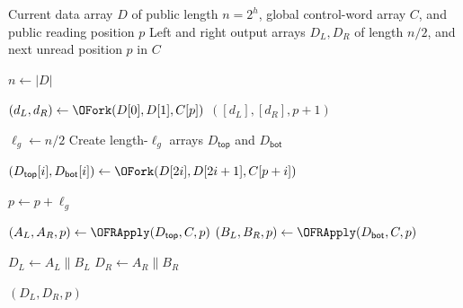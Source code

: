 \begin{algorithm}[t]
\caption{$\OFRApply(D,C,p)$}
\label{alg:ofr-apply}
\begin{algorithmic}[1]
\Require Current data array $D$ of public length $n=2^h$,
global control-word array $C$, and public reading position $p$
\Ensure Left and right output arrays $D_L,D_R$ of length $n/2$,
and next unread position $p$ in $C$

\State $n\gets |D|$

    \State $(d_L,d_R)\gets
           \OFork(D[0],D[1],C[p])$
    \State \Return $([d_L],[d_R],p+1)$
\EndIf

\State $\ell_g\gets n/2$
\State Create length-$\ell_g$ arrays
       $D_{\mathsf{top}}$ and $D_{\mathsf{bot}}$

    \State $(D_{\mathsf{top}}[i],D_{\mathsf{bot}}[i])
           \gets
           \OFork(D[2i],D[2i+1],C[p+i])$
\EndFor

\State $p\gets p+\ell_g$

\State $(A_L,A_R,p)\gets
       \OFRApply(D_{\mathsf{top}},C,p)$
\State $(B_L,B_R,p)\gets
       \OFRApply(D_{\mathsf{bot}},C,p)$

\State $D_L\gets A_L\parallel B_L$
\State $D_R\gets A_R\parallel B_R$

\State \Return $(D_L,D_R,p)$
\end{algorithmic}
\end{algorithm}
